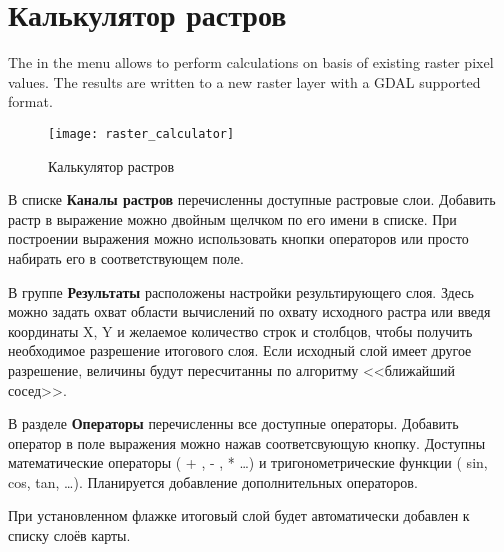 \section{Калькулятор растров}\label{sec:raster_calc}

The  in the  menu allows to
perform calculations on basis of existing raster pixel values. The results
are written to a new raster layer with a GDAL supported format.

\begin{figure}[ht]
  \centering
    \texttt{[image: raster\_calculator]}
    \caption{Калькулятор растров \wincaption}\label{fig:raster_calculator}
\end{figure}

В списке \textbf{Каналы растров} перечисленны доступные растровые слои.
Добавить растр в выражение можно двойным щелчком по его имени в списке.
При построении выражения можно использовать кнопки операторов или просто
набирать его в соответствующем поле.

В группе \textbf{Результаты} расположены настройки результирующего слоя.
Здесь можно задать охват области вычислений по охвату исходного растра или
введя координаты X, Y и желаемое количество строк и столбцов, чтобы получить
необходимое разрешение итогового слоя. Если исходный слой имеет другое
разрешение, величины будут пересчитанны по алгоритму <<ближайший сосед>>.

В разделе \textbf{Операторы} перечисленны все доступные операторы. Добавить
оператор в поле выражения можно нажав соответсвующую кнопку. Доступны
математические операторы ( + , - , * \dots) и тригонометрические функции
( sin, cos, tan, \dots). Планируется добавление дополнительных операторов.

При установленном флажке  итоговый слой
будет автоматически добавлен к списку слоёв карты.

\FloatBarrier
